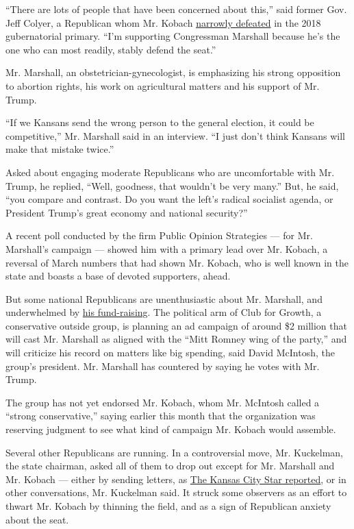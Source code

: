 ``There are lots of people that have been concerned about this,'' said
former Gov. Jeff Colyer, a Republican whom Mr. Kobach
\href{https://www.nytimes.com/2018/08/14/us/politics/kansas-kobach-colyer.html}{narrowly
defeated} in the 2018 gubernatorial primary. ``I'm supporting
Congressman Marshall because he's the one who can most readily, stably
defend the seat.''

Mr. Marshall, an obstetrician-gynecologist, is emphasizing his strong
opposition to abortion rights, his work on agricultural matters and his
support of Mr. Trump.

``If we Kansans send the wrong person to the general election, it could
be competitive,'' Mr. Marshall said in an interview. ``I just don't
think Kansans will make that mistake twice.''

Asked about engaging moderate Republicans who are uncomfortable with Mr.
Trump, he replied, ``Well, goodness, that wouldn't be very many.'' But,
he said, ``you compare and contrast. Do you want the left's radical
socialist agenda, or President Trump's great economy and national
security?''

A recent poll conducted by the firm Public Opinion Strategies --- for
Mr. Marshall's campaign --- showed him with a primary lead over Mr.
Kobach, a reversal of March numbers that had shown Mr. Kobach, who is
well known in the state and boasts a base of devoted supporters, ahead.

But some national Republicans are unenthusiastic about Mr. Marshall, and
underwhelmed by
\href{https://www.kansascity.com/news/politics-government/article242025641.html}{his
fund-raising}. The political arm of Club for Growth, a conservative
outside group, is planning an ad campaign of around \$2 million that
will cast Mr. Marshall as aligned with the ``Mitt Romney wing of the
party,'' and will criticize his record on matters like big spending,
said David McIntosh, the group's president. Mr. Marshall has countered
by saying he votes with Mr. Trump.

The group has not yet endorsed Mr. Kobach, whom Mr. McIntosh called a
``strong conservative,'' saying earlier this month that the organization
was reserving judgment to see what kind of campaign Mr. Kobach would
assemble.

Several other Republicans are running. In a controversial move, Mr.
Kuckelman, the state chairman, asked all of them to drop out except for
Mr. Marshall and Mr. Kobach --- either by sending letters, as
\href{https://www.kansascity.com/news/politics-government/article242232001.html}{The
Kansas City Star reported}, or in other conversations, Mr. Kuckelman
said. It struck some observers as an effort to thwart Mr. Kobach by
thinning the field, and as a sign of Republican anxiety about the seat.

